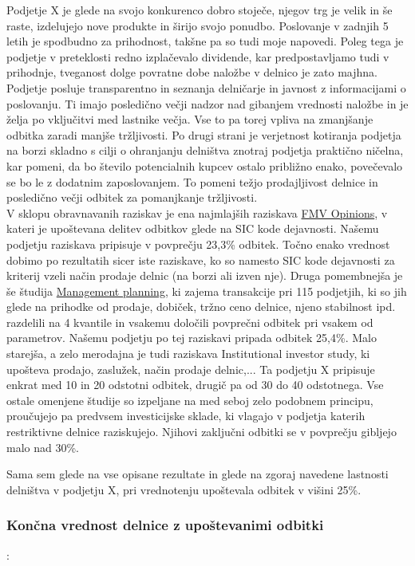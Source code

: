 \documentclass[12pt,a4paper]{amsart}
\theoremstyle{definition} %
\theoremstyle{plain} %
\begin{document}
\begin{itemize}
Podjetje X je glede na svojo konkurenco dobro stoječe, njegov trg je velik in še raste, izdelujejo nove produkte in širijo svojo ponudbo. Poslovanje v zadnjih 5 letih je spodbudno za prihodnost, takšne pa so tudi moje napovedi. Poleg tega je podjetje v preteklosti redno izplačevalo dividende, kar predpostavljamo tudi v prihodnje, tveganost dolge povratne dobe naložbe v delnico je zato majhna. Podjetje posluje transparentno in seznanja delničarje in javnost z informacijami o poslovanju. Ti imajo posledično večji nadzor nad gibanjem vrednosti naložbe in je želja po vključitvi med lastnike večja. Vse to pa torej vpliva na zmanjšanje odbitka zaradi manjše tržljivosti. Po drugi strani je verjetnost kotiranja podjetja na borzi skladno s cilji o ohranjanju delništva znotraj podjetja praktično ničelna, kar pomeni, da bo število potencialnih kupcev ostalo približno enako, povečevalo se bo le z dodatnim zaposlovanjem. To pomeni težjo prodajljivost delnice in posledično večji odbitek za pomanjkanje tržljivosti.\\
V sklopu obravnavanih raziskav je ena najmlajših raziskava \underline{FMV Opinions}, v kateri je upoštevana delitev odbitkov glede na SIC kode dejavnosti. Našemu podjetju raziskava pripisuje v povprečju 23,3\% odbitek. Točno enako vrednost dobimo po rezultatih sicer iste raziskave, ko so namesto SIC kode dejavnosti za kriterij vzeli način prodaje delnic (na borzi ali izven nje). Druga pomembnejša je še študija \underline{Management planning}, ki zajema transakcije pri 115 podjetjih, ki so jih glede na prihodke od prodaje, dobiček, tržno ceno delnice, njeno stabilnost ipd. razdelili na 4 kvantile in vsakemu določili povprečni odbitek pri vsakem od parametrov. Našemu podjetju po tej raziskavi pripada odbitek 25,4\%. Malo starejša, a zelo merodajna je tudi raziskava Institutional investor study, ki upošteva prodajo, zaslužek, način prodaje delnic,... Ta podjetju X pripisuje enkrat med 10 in 20 odstotni odbitek, drugič pa od 30 do 40 odstotnega. Vse ostale omenjene študije so izpeljane na med seboj zelo podobnem principu, proučujejo pa predvsem investicijske sklade, ki vlagajo v podjetja katerih restriktivne delnice raziskujejo. Njihovi zaključni odbitki se v povprečju gibljejo malo nad 30\%.\par
Sama sem glede na vse opisane rezultate in glede na zgoraj navedene lastnosti delništva v podjetju X, pri vrednotenju upoštevala odbitek v višini 25\%.\\


\subsubsection{Končna vrednost delnice z upoštevanimi odbitki}:\\


\end{itemize}
\end{document}
